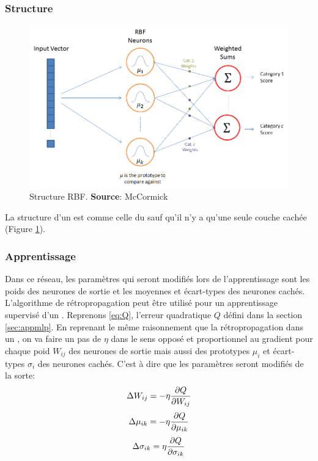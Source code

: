 \subsubsection{Structure}
\begin{figure}
 \centering
 \includegraphics[scale=0.5]{../figures/RBFstruct.png}
 \caption{Structure RBF. \textbf{Source}: McCormick\cite{RBFtuto}}
 \label{structurerbf}
\end{figure}
La structure d'un \rbf est comme celle du \mlp sauf qu'il n'y a qu'une seule couche cachée (Figure \ref{structurerbf}).
\subsubsection{Apprentissage}
Dans ce réseau, les paramètres qui seront modifiés lors de l'apprentissage sont les poids des neurones de sortie et les moyennes et écart-types des neurones cachés.
L'algorithme de rétropropagation peut être utilisé pour un apprentissage supervisé d'un \rbf.
Reprenons \eqref{eq:Q}, l'erreur quadratique $Q$ défini dans la section \ref{sec:appmlp}.
En reprenant le même raisonnement que la rétropropagation dans un \mlp,
on va faire un pas de $\eta$ dans le sens opposé et proportionnel au gradient pour chaque poid $W_{ij}$ des neurones de sortie mais aussi des prototypes $\mu_i$ et écart-types $\sigma_i$ des neurones cachés.
C'est à dire que les paramètres seront modifiés de la sorte:
\begin{equation}%
 \Delta W_{ij} = -\eta \partiel{Q}{W_{ij}}
\end{equation}
\begin{equation}%
 \Delta \mu_{ik} = -\eta \partiel{Q}{\mu_{ik}}
\end{equation}
\begin{equation}%
 \Delta \sigma_{ik} = \eta \partiel{Q}{\sigma_{ik}}
\end{equation}

